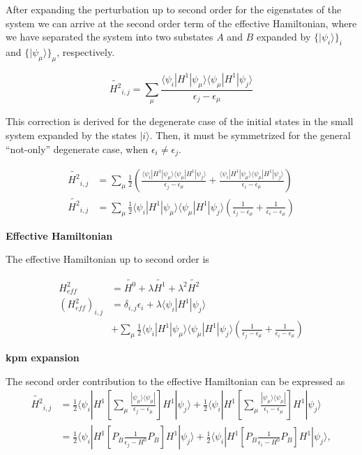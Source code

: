 \documentclass[10pt, onecolumn, aps, prb, superscriptaddress, floatfix, showpacs, notitlepage]{revtex4-1}
\newcommand{\bra}[1]{\langle #1|}
\newcommand{\ket}[1]{|#1\rangle}
\begin{document}
After expanding the perturbation up to second order for the eigenstates of the system
we can arrive at the second order term of the effective Hamiltonian, where we have
separated the system into two substates $A$ and $B$ expanded by $\{\ket{\psi_i}\}_i$ and
$\{\ket{\psi_\mu}\}_\mu$, respectively.

$$
\tilde{H^2}_{i,j} = \sum_\mu\frac{
\bra{\psi_i} H^1 \ket{\psi_\mu}
\bra{\psi_\mu} H^1 \ket{\psi_j}
}
{\epsilon_j-\epsilon_\mu
}
$$

This correction is derived for the degenerate case of the initial states
in the small system expanded by the states $\ket{i}$.
Then, it must be symmetrized for the general
``not-only'' degenerate case, when $\epsilon_i\ne \epsilon_j$.

\begin{align}
\tilde{H^2}_{i,j} &= \sum_\mu\frac{1}{2}
\left(
\frac{
\bra{\psi_i} H^1 \ket{\psi_\mu}
\bra{\psi_\mu} H^1 \ket{\psi_j}}{\epsilon_j-\epsilon_\mu}
+
\frac{
\bra{\psi_i} H^1 \ket{\psi_\mu}
\bra{\psi_\mu} H^1 \ket{\psi_j}}{\epsilon_i-\epsilon_\mu}
\right)
\\
\tilde{H^2}_{i,j} &= \sum_\mu\frac{1}{2}
\bra{\psi_i} H^1 \ket{\psi_\mu}
\bra{\psi_\mu} H^1 \ket{\psi_j}
\left(\frac{1}{\epsilon_j-\epsilon_\mu}
+\frac{1}{\epsilon_i-\epsilon_\mu}
\right)
\end{align}


\textbf{Effective Hamiltonian}

The effective Hamiltonian up to second order is

\begin{align}
H_{eff}^2 &= \tilde{H^0} + \lambda \tilde{H^1} + \lambda^2\tilde{H^2}\\
(H_{eff}^2)_{i,j} &= \delta_{i,j}\epsilon_i +
\lambda \bra{\psi_i} H^1 \ket{\psi_j} \\
&+
\sum_\mu\frac{1}{2}
\bra{\psi_i} H^1 \ket{\psi_\mu}
\bra{\psi_\mu} H^1 \ket{\psi_j}
\left(\frac{1}{\epsilon_j-\epsilon_\mu}
+\frac{1}{\epsilon_i-\epsilon_\mu}
\right)
\end{align}

\textbf{kpm expansion}

The second order contribution to the effective Hamiltonian can be expressed as
\begin{align}
\tilde{H^2}_{i,j} &= \frac{1}{2}
\bra{\psi_i} H^1
\left[
\sum_\mu
\frac{\ket{\psi_\mu} \bra{\psi_\mu}}{\epsilon_j-\epsilon_\mu}
\right]
H^1 \ket{\psi_j}
+
\frac{1}{2}
\bra{\psi_i} H^1
\left[
\sum_\mu
\frac{\ket{\psi_\mu} \bra{\psi_\mu}}{\epsilon_i-\epsilon_\mu}
\right]
H^1 \ket{\psi_j}
\\
&= \frac{1}{2}
\bra{\psi_i} H^1
\left[P_B
\frac{1}{\epsilon_j-H^0}
P_B\right]
H^1 \ket{\psi_j}
+
\frac{1}{2}
\bra{\psi_i} H^1
\left[P_B
\frac{1}{\epsilon_i-H^0}
P_B\right]
H^1 \ket{\psi_j},
\end{align}
\end{document}
